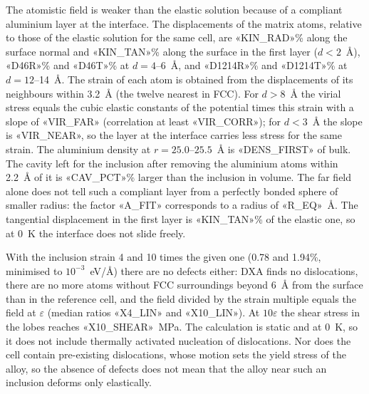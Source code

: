 The atomistic field is weaker than the elastic solution because of a compliant
aluminium layer at the interface. The displacements
of the matrix atoms, relative to those of the elastic solution for the same
cell, are «KIN_RAD»\% along the surface normal and «KIN_TAN»\% along the
surface in the first layer ($d<2$~\AA), «D46R»\% and «D46T»\% at
$d=4$--6~\AA, and «D1214R»\% and «D1214T»\% at $d=12$--14~\AA. The strain of
each atom is obtained from the displacements of its neighbours within 3.2~\AA{} (the twelve nearest in FCC).
For $d>8$~\AA{} the virial stress equals the cubic elastic constants of the
potential times this strain with a slope of «VIR_FAR» (correlation at least
«VIR_CORR»); for $d<3$~\AA{} the slope is «VIR_NEAR», so the layer at the
interface carries less stress for the same strain. The aluminium density at
$r=25.0$--$25.5$~\AA{} is «DENS_FIRST» of bulk. The cavity left for the
inclusion after removing the aluminium atoms within 2.2~\AA{} of it is
«CAV_PCT»\% larger than the inclusion in volume. The far field alone does not
tell such a compliant layer from a perfectly bonded sphere of smaller radius:
the factor «A_FIT» corresponds to a radius of «R_EQ»~\AA. The tangential
displacement in the first layer is «KIN_TAN»\% of the elastic one, so at 0~K
the interface does not slide freely.

With the inclusion strain 4 and 10 times the given one (0.78 and 1.94\%,
minimised to $10^{-3}$~eV/\AA) there are no defects either: DXA finds no
dislocations, there are no more atoms without FCC surroundings beyond 6~\AA{}
from the surface than in the reference cell, and the field divided by the
strain multiple equals the field at $\varepsilon$ (median ratios «X4_LIN» and
«X10_LIN»). At $10\varepsilon$ the shear stress in the lobes reaches
«X10_SHEAR»~MPa. The calculation is static and at 0~K, so it does not include
thermally activated nucleation of dislocations. Nor does the cell contain
pre-existing dislocations, whose motion sets the yield stress of the alloy,
so the absence of defects does not mean that the alloy near such an
inclusion deforms only elastically.
